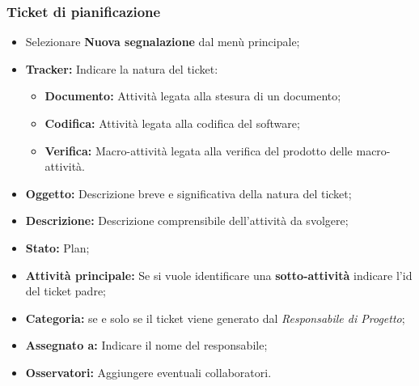      \subsubsection{Ticket di pianificazione}
        \begin{itemize}
          \item Selezionare \textbf{Nuova segnalazione} dal menù principale;
          \item \textbf{Tracker: }Indicare la natura del ticket:
          \bgroup
            \begin{itemize}
              \item \textbf{Documento: }Attività legata alla stesura di un documento;
              \item \textbf{Codifica: }Attività legata alla  codifica del software;
              \item \textbf{Verifica: }Macro-attività legata alla verifica del prodotto delle macro-attività.
            \end{itemize}
          \egroup
          \item \textbf{Oggetto: }Descrizione breve e significativa della natura del ticket;
          \item \textbf{Descrizione: }Descrizione comprensibile dell'attività da svolgere;
          \item \textbf{Stato: }Plan;
          \item \textbf{Attività principale: }Se si vuole identificare una \textbf{sotto-attività} indicare l'id del ticket padre;
          \item \textbf{Categoria: } se e solo se il ticket viene generato dal \emph{Responsabile di Progetto};
          \item \textbf{Assegnato a: }Indicare il nome del responsabile;
          \item \textbf{Osservatori: }Aggiungere eventuali collaboratori.
        \end{itemize}
